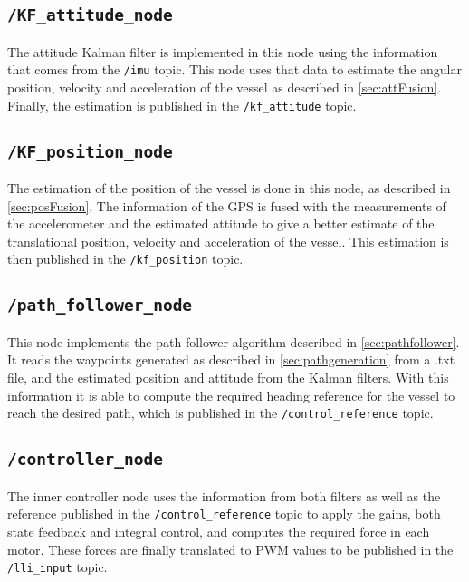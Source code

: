 \subsection*{\lstinline[style=cinline]{/KF_attitude_node}}
The attitude Kalman filter is implemented in this node using the information that comes from the \lstinline[style=cinline]{/imu} topic. This node uses that data to estimate the angular position, velocity and acceleration of the vessel as described in \autoref{sec:attFusion}. Finally, the estimation is published in the \lstinline[style=cinline]{/kf_attitude} topic.

\subsection*{\lstinline[style=cinline]{/KF_position_node}}
The estimation of the position of the vessel is done in this node, as described in \autoref{sec:posFusion}. The information of the GPS is fused with the measurements of the accelerometer and the estimated attitude to give a better estimate of the translational position, velocity and acceleration of the vessel. This estimation is then published in the \lstinline[style=cinline]{/kf_position} topic.

\subsection*{\lstinline[style=cinline]{/path_follower_node}}
This node implements the path follower algorithm described in \autoref{sec:pathfollower}. It reads the waypoints generated as described in \autoref{sec:pathgeneration} from a .txt file, and the estimated position and attitude from the Kalman filters. With this information it is able to compute the required heading reference for the vessel to reach the desired path, which is published in the \lstinline[style=cinline]{/control_reference} topic.

\subsection*{\lstinline[style=cinline]{/controller_node}}
The inner controller node uses the information from both filters as well as the reference published in the \lstinline[style=cinline]{/control_reference} topic to apply the gains, both state feedback and integral control, and computes the required force in each motor. These forces are finally translated to PWM values to be published in the \lstinline[style=cinline]{/lli_input} topic.

